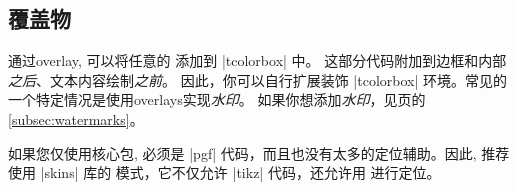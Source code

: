 \subsection{覆盖物}\label{subsec:overlays}
通过overlay, 可以将任意的  添加到 |tcolorbox| 中。
这部分代码附加到边框和内部%
\emph{之后}、文本内容绘制\emph{之前}。 因此，你可以自行扩展装饰 |tcolorbox| 环境。常见的一个特定情况是使用overlays实现\emph{水印}。
如果你想添加\emph{水印}，见\pageref{subsec:watermarks}页的\ref{subsec:watermarks}。



\begin{marker}
  
  如果您仅使用核心包,  必须是 |pgf| 代码，而且也没有太多的定位辅助。因此, 推荐使用 |skins| 库的  模式，它不仅允许 |tikz| 代码，还允许用  进行定位。
  \end{marker}
 
